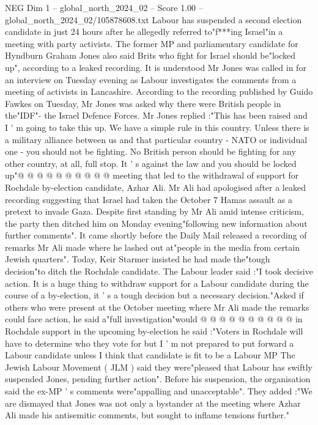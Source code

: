 \begin{textsample}{NEG Dim 1 – global\_north\_2024\_02 – Score 1.00 – global\_north\_2024\_02/105878608.txt}  \label{ex:f1_neg_355}
Labour has suspended a second election candidate in just 24 hours after he allegedly referred to"f***ing Israel"in a meeting with party activists.
The former MP and parliamentary candidate for Hyndburn Graham Jones also said Brits who fight for Israel should be"locked up", according to a leaked recording.
It is understood Mr Jones was called in for an interview on Tuesday evening as Labour investigates the comments from a meeting of activists in Lancashire.
According to the recording published by Guido Fawkes on Tuesday, Mr Jones was asked why there were British people in the"IDF"- the Israel Defence Forces.
Mr Jones replied :"This has been raised and I ' m going to take this up.
We have a simple rule in this country.
Unless there is a military alliance between us and that particular country - NATO or individual one - you should not be fighting.
No British person should be fighting for any other country, at all, full stop.
It ' s against the law and you should be locked up"@ @ @ @ @ @ @ @ @ @ meeting that led to the withdrawal of support for Rochdale by-election candidate, Azhar Ali.
Mr Ali had apologised after a leaked recording suggesting that Israel had taken the October 7 Hamas assault as a pretext to invade Gaza.
Despite first standing by Mr Ali amid intense criticism, the party then ditched him on Monday evening"following new information about further comments".
It came shortly before the Daily Mail released a recording of remarks Mr Ali made where he lashed out at"people in the media from certain Jewish quarters".
Today, Keir Starmer insisted he had made the"tough decision"to ditch the Rochdale candidate.
The Labour leader said :"I took decisive action.
It is a huge thing to withdraw support for a Labour candidate during the course of a by-election, it ' s a tough decision but a necessary decision."Asked if others who were present at the October meeting where Mr Ali made the remarks could face action, he said a"full investigation"would @ @ @ @ @ @ @ @ @ @ in Rochdale support in the upcoming by-election he said :"Voters in Rochdale will have to determine who they vote for but I ' m not prepared to put forward a Labour candidate unless I think that candidate is fit to be a Labour MP The Jewish Labour Movement ( JLM ) said they were"pleased that Labour has swiftly suspended Jones, pending further action".
Before his suspension, the organisation said the ex-MP ' s comments were"appalling and unacceptable".
They added :"We are dismayed that Jones was not only a bystander at the meeting where Azhar Ali made his antisemitic comments, but sought to inflame tensions further."

\end{textsample}
